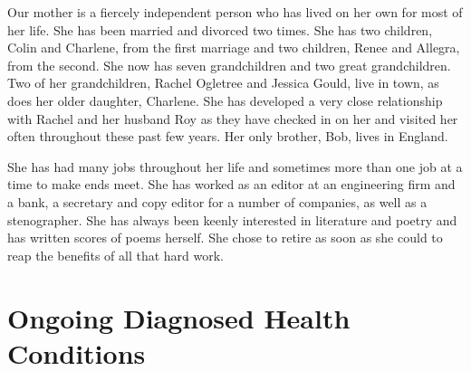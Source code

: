 \documentclass[]{article}
\begin{document}
Our mother is a fiercely independent person who has lived on her own for most of her life. She has been married and divorced two times. She has two children, Colin and Charlene, from the first marriage and two children, Renee and Allegra, from the second. She now has seven grandchildren and two great grandchildren. Two of her grandchildren, Rachel Ogletree and Jessica Gould, live in town, as does her older daughter, Charlene. She has developed a very close relationship with Rachel and her husband Roy as they have checked in on her and visited her often throughout these past few years. Her only brother, Bob, lives in England.

She has had many jobs throughout her life and sometimes more than one job at a time to make ends meet. She has worked as an editor at an engineering firm and a bank, a secretary and copy editor for a number of companies, as well as a stenographer. She has always been keenly interested in literature and poetry and has written scores of poems herself. She chose to retire as soon as she could to reap the benefits of all that hard work.

\section*{Ongoing Diagnosed Health Conditions}
\end{document}
